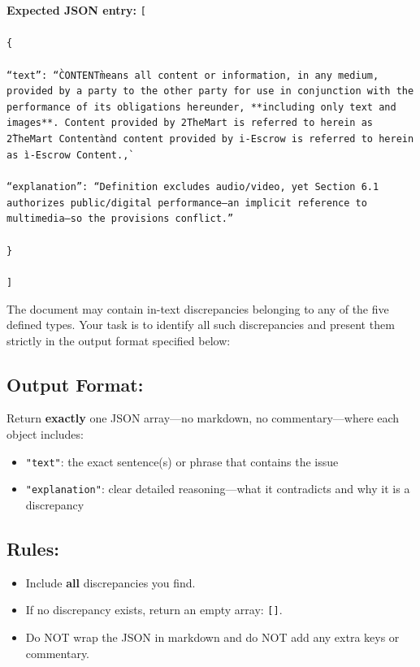 \begin{tcolorbox}[breakable,colback=lightestgray,colframe=black,title=\textbf{Eval\_3 L2: In-Text Discrepancy Detection Prompt}]
\textbf{Expected JSON entry:}
{\small
\texttt{[\\\\
\{\\\\
``text'': ``\`CONTENT\` means all content or information, in any medium, provided by a party to the other party for use in conjunction with the performance of its obligations hereunder, **including only text and images**. Content provided by 2TheMart is referred to herein as \`2TheMart Content\` and content provided by i-Escrow is referred to herein as \`i-Escrow Content.\`,\\\\
``explanation'': ``Definition excludes audio/video, yet Section 6.1 authorizes public/digital performance—an implicit reference to multimedia—so the provisions conflict.''\\\\
\}\\\\
]}
}

The document may contain in-text discrepancies belonging to any of the five defined types. Your task is to identify all such discrepancies and present them strictly in the output format specified below:

\subsection*{\textbf{Output Format:}}
Return \textbf{exactly} one JSON array—no markdown, no commentary—where each object includes:
\begin{itemize}
    \item \texttt{"text"}: the exact sentence(s) or phrase that contains the issue
    \item \texttt{"explanation"}: clear detailed reasoning—what it contradicts and why it is a discrepancy
\end{itemize}

\subsection*{\textbf{Rules:}}
\begin{itemize}
    \item Include \textbf{all} discrepancies you find.
    \item If no discrepancy exists, return an empty array: \texttt{[]}.
    \item Do NOT wrap the JSON in markdown and do NOT add any extra keys or commentary.
\end{itemize}
\end{tcolorbox}
